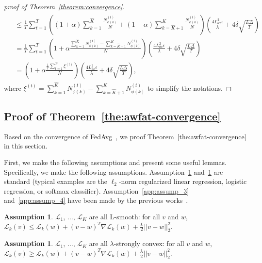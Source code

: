 \documentclass{article} %
\theoremstyle{plain}
\theoremstyle{definition}
\newtheorem{assumption}[theorem]{Assumption}
\theoremstyle{remark}
\begin{document}
\begin{proof}[proof of Theorem~\ref{theorem:convergence}]
\begin{align}
\begin{split}
& \leq \frac{1}{T}\sum_{t=1}^T\left((1+\alpha) \sum_{k=1}^{\widehat{K}} \frac{N_{\phi(k)}^{(t)}}{N} + (1-\alpha) \sum_{k=\widehat{K}+1}^{K} \frac{N_{\phi(k)}^{(t)}}{N}\right)\left(\frac{4L^2_{\theta x}\epsilon}{\lambda}+4\delta\sqrt{\frac{L\Delta}{T}}\right)\\
& =  \frac{1}{T}\sum_{t=1}^T\left(1+\alpha  \frac{\sum_{k=1}^{\widehat{K}} N_{\phi(k)}^{(t)} - \sum_{k=\widehat{K}+1}^{K}N_{\phi(k)}^{(t)}}{N}\right)\left(\frac{4L^2_{\theta x}\epsilon}{\lambda}+4\delta\sqrt{\frac{L\Delta}{T}}\right)\\
& =  \left(1+\alpha\frac{\frac{1}{T}\sum_{t=1}^T\xi^{(t)}}{N}\right) \left(\frac{4L^2_{\theta x}\epsilon}{\lambda}+4\delta\sqrt{\frac{L\Delta}{T}}\right),   
\end{split}
\end{align}
where $\xi^{(t)}=\sum_{k=1}^{\widehat{K}} N_{\phi(k)}^{(t)} - \sum_{k=\widehat{K}+1}^{K}N_{\phi(k)}^{(t)}$ to simplify the notations.
\end{proof}



\subsection{Proof of Theorem~\ref{the:awfat-convergence}}
\label{sec:app_comp_proof_section43}

Based on the convergence of FedAvg~\citep{li2019convergence}, we proof Theorem~\ref{the:awfat-convergence} in this section.

First, we make the following assumptions and present some useful lemmas. Specifically, we make the following assumptions. Assumption~\ref{app:assump_1} and~\ref{app:assump_2} are standard (typical examples are the $\ell_2$-norm regularized linear regression, logistic regression, or softmax classifier). Assumption~\ref{app:assump_3} and~\ref{app:assump_4} have been made by the previous works~\citep{zhang2013communication,li2019convergence}.

\begin{assumption}
\label{app:assump_1}
$\mathcal{L}_1$, $\dots$, $\mathcal{L}_{K}$ are all L-smooth: for all $v$ and $w$, $\mathcal{L}_k(v)\leq \mathcal{L}_k(w)+(v-w)^T\nabla \mathcal{L}_k(w)+\frac{L}{2}||v-w||_2^2$.
\end{assumption}

\begin{assumption}
\label{app:assump_2}
$\mathcal{L}_1$, $\dots$, $\mathcal{L}_{K}$ are all $\lambda$-strongly convex: for all $v$ and $w$, $\mathcal{L}_k(v)\geq \mathcal{L}_k(w)+(v-w)^T\nabla \mathcal{L}_k(w)+\frac{\lambda}{2}||v-w||_2^2$.
\end{assumption}
\end{document}
